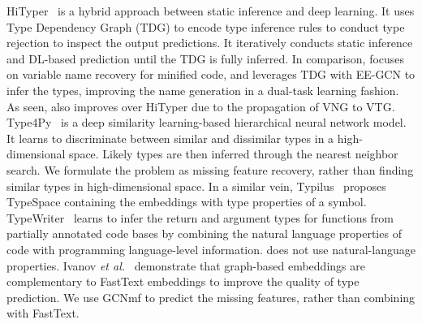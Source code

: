 HiTyper~\cite{HiTyper-icse22} is a hybrid approach between static
inference and deep learning. It uses Type Dependency Graph (TDG) to
encode type inference rules to conduct type rejection to inspect the
output predictions. It iteratively conducts static inference and
DL-based prediction until the TDG is fully inferred. In comparison,
{\tool} focuses on variable name recovery for minified code, and
leverages TDG with EE-GCN to infer the types, improving the name
generation in a dual-task learning fashion. As seen, {\tool} also
improves over HiTyper due to the propagation of VNG to VTG.
%
Type4Py~\cite{Type4Py-icse22} is a deep similarity learning-based
hierarchical neural network model. It learns to discriminate between
similar and dissimilar types in a high-dimensional space. Likely types
are then inferred through the nearest neighbor search. We formulate
the problem as missing feature recovery, rather than finding similar
types in high-dimensional space. In a similar vein,
Typilus~\cite{typilus-pldi20} proposes TypeSpace containing the
embeddings with type properties of a
symbol. TypeWriter~\cite{typewriter-fse20} learns to infer the return
and argument types for functions from partially annotated code bases
by combining the natural language properties of code with programming
language-level information. {\tool} does not use natural-language
properties. Ivanov {\em et al.}~\cite{ivanov21predicting} demonstrate
that graph-based embeddings are complementary to FastText embeddings
to improve the quality of type prediction. We use GCNmf to predict
the missing features, rather than combining with FastText.



